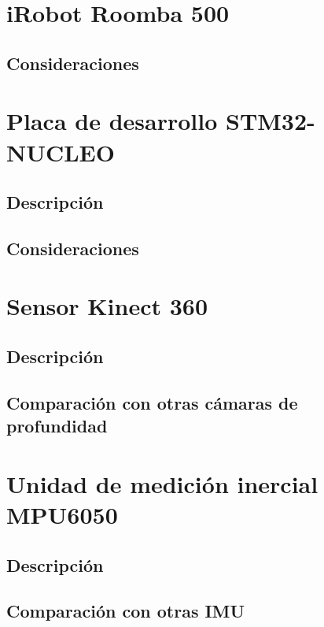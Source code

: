 \section{iRobot Roomba 500}
\subsection{Consideraciones}
\section{Placa de desarrollo STM32-NUCLEO}
\subsection{Descripción}
\subsection{Consideraciones}
\section{Sensor Kinect 360}
\subsection{Descripción}
\subsection{Comparación con otras cámaras de profundidad}
\section{Unidad de medición inercial MPU6050}
\subsection{Descripción}
\subsection{Comparación con otras IMU}
